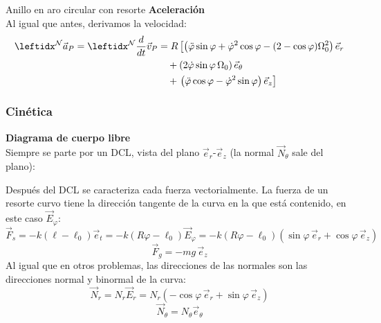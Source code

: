 \begin{solucion}{Anillo en aro circular con resorte}
\textbf{Aceleración}\\
Al igual que antes, derivamos la velocidad:
\begin{align*}
\marc{\vec{a}_P}{N}=\der{\vec{v}_P}{N}{} &= R \left[
\left( \ddot{\varphi} \sin\varphi + \dot{\varphi}^2 \cos\varphi - (2 - \cos\varphi) \Omega_0^2 \right) \vec{e}_r \right. \\
&\quad + \left(2 \dot{\varphi} \sin\varphi\, \Omega_0 \right) \vec{e}_\theta \\
&\quad + \left. \left( \ddot{\varphi} \cos\varphi - \dot{\varphi}^2 \sin\varphi \right) \vec{e}_z \right]
\end{align*}

\subsubsection*{Cinética}
\textbf{Diagrama de cuerpo libre}\\
Siempre se parte por un DCL, vista del plano $\vec{e}_r$-$\vec{e}_z$ (la normal $\vec{N}_\theta$ sale del plano):
\begin{center}
\end{center}

Después del DCL se caracteriza cada fuerza vectorialmente. La fuerza de un resorte curvo tiene la dirección tangente de la curva en la que está contenido, en este caso $\vec{E}_\varphi$:
$$\vec{F}_s=-k(\ell-\ell_0)\vec{e}_t=-k(R\varphi-\ell_0)\vec{E}_{\varphi}=-k(R\varphi-\ell_0)\left(\sin\varphi\,\vec{e}_r+\cos\varphi\,\vec{e}_z\right)$$
$$\vec{F}_g=-mg\,\vec{e}_z$$
Al igual que en otros problemas, las direcciones de las normales son las direcciones normal y binormal de la curva:
$$\vec{N}_r=N_r\vec{E}_r=N_r\left( -\cos\varphi\,\vec{e}_r + \sin\varphi\,\vec{e}_z \right)$$
$$\vec{N}_\theta=N_\theta\vec{e}_\theta$$



\end{solucion}
